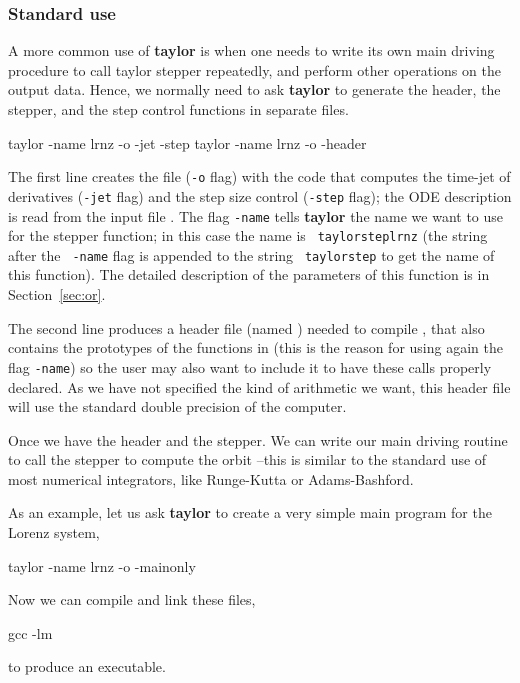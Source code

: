 \documentclass[10pt]{article}
\theoremstyle{remark}
\newcommand{\taylorname}{{\bf taylor}}
\newcommand{\inputfile}{}
\newcommand{\mainfile}{}
\newcommand{\odecfile}{}
\newcommand{\odehfile}{}
\begin{document}
\subsubsection*{Standard use}
A more common use of \taylorname{} is when one needs to write its own
main driving procedure to call taylor stepper repeatedly, and perform
other operations on the output data. Hence, we normally need to ask
\taylorname{} to generate the header, the stepper, and the step
control functions in separate files.
\begin{command}
   taylor -name lrnz -o \odecfile{} -jet -step \inputfile{}
   taylor -name lrnz -o \odehfile{} -header \inputfile{}
\end{command}
The first line creates the file \odecfile{} ({\tt -o} flag) with the
code that computes the time-jet of derivatives ({\tt -jet} flag) and
the step size control ({\tt -step} flag); the ODE description is read
from the input file \inputfile{}. The flag {\tt -name}  tells
\taylorname{} the name we want to use for the stepper function; in this case the name is {\tt
  taylorsteplrnz} (the string after the {\tt
  -name} flag is appended to the string {\tt
  taylorstep} to get the name of this
function). The detailed description of the parameters of this function
is in Section~\ref{sec:or}.

The second line produces a header file (named \odehfile{}) needed to
compile \odecfile{}, that also contains the prototypes of the
functions in \odecfile{} (this is the reason for using again the flag
{\tt -name}) so the user may also want to include it to have these
calls properly declared. As we have not specified the kind of
arithmetic we want, this header file will use the standard double
precision of the computer.

\smallskip

Once we have the header and the stepper. We can write our main driving
routine to call the stepper to compute the orbit --this is similar to
the standard use of most numerical integrators, like Runge-Kutta or
Adams-Bashford.

\smallskip

As an example, let us ask \taylorname{} to create a very simple main
program for the Lorenz system,
\begin{command}
   taylor -name lrnz -o \mainfile{} -mainonly \inputfile{}
\end{command}
Now we can compile and link these files,
\begin{command}
   gcc  \mainfile{} \odecfile{} -lm
\end{command}
to produce an executable. 
\end{document}
